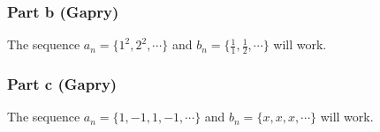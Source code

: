 \subsubsection*{Part b (Gapry)}
The sequence $ a_n = \{1^2, 2^2, \cdots \} $ and $ b_n = \{\frac{1}{1}, \frac{1}{2}, \cdots \} $ will work.


\subsubsection*{Part c (Gapry)}
The sequence $ a_n = \{1, -1, 1, -1, \cdots \} $ and $ b_n = \{x, x, x, \cdots \} $ will work.